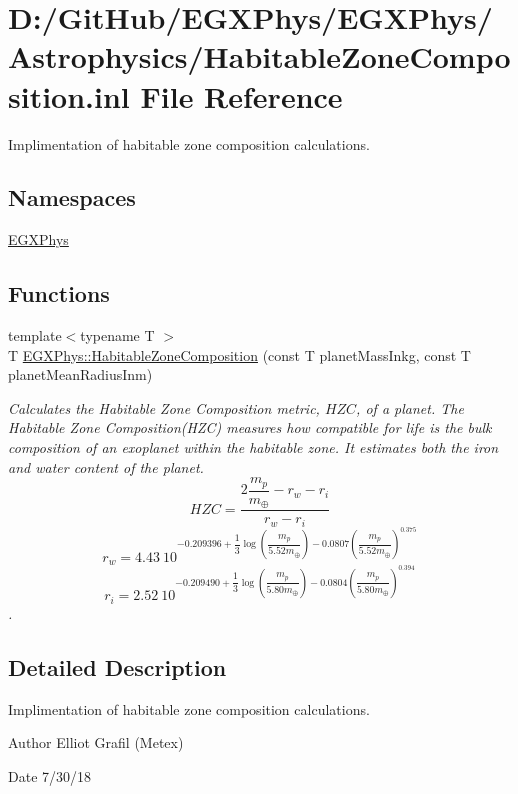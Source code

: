 \hypertarget{_habitable_zone_composition_8inl}{}\section{D\+:/\+Git\+Hub/\+E\+G\+X\+Phys/\+E\+G\+X\+Phys/\+Astrophysics/\+Habitable\+Zone\+Composition.inl File Reference}
\label{_habitable_zone_composition_8inl}


Implimentation of habitable zone composition calculations.  


\subsection*{Namespaces}
\begin{DoxyCompactItemize}
\item 
 \mbox{\hyperlink{namespace_e_g_x_phys}{E\+G\+X\+Phys}}
\end{DoxyCompactItemize}
\subsection*{Functions}
\begin{DoxyCompactItemize}
\item 
{\footnotesize template$<$typename T $>$ }\\T \mbox{\hyperlink{group___e_g_x_phys-_astrophysics-_habitable_zone_composition_ga9fe32e7d12b68d2596a0a8409681acdc}{E\+G\+X\+Phys\+::\+Habitable\+Zone\+Composition}} (const T planet\+Mass\+Inkg, const T planet\+Mean\+Radius\+Inm)
\begin{DoxyCompactList}\small\item\em Calculates the Habitable Zone Composition metric, $HZC$, of a planet. The Habitable Zone Composition(\+H\+Z\+C) measures how compatible for life is the bulk composition of an exoplanet within the habitable zone. It estimates both the iron and water content of the planet. \[ HZC= \dfrac{ 2\dfrac{m_p}{m_{\oplus}} - r_w - r_i } { r_w - r_i } \] \[ r_w= 4.43\ 10^{ -0.209396 + \dfrac{1}{3}\log \left ( \dfrac{m_p}{5.52 m_\oplus} \right ) - 0.0807 \left ( \dfrac{m_p}{5.52 m_\oplus} \right )^{0.375}} \] \[ r_i= 2.52\ 10^{ -0.209490 + \dfrac{1}{3}\log \left ( \dfrac{m_p}{5.80 m_\oplus} \right ) - 0.0804 \left ( \dfrac{m_p}{5.80 m_\oplus} \right )^{0.394}} \]. \end{DoxyCompactList}\end{DoxyCompactItemize}


\subsection{Detailed Description}
Implimentation of habitable zone composition calculations. 

\begin{DoxyAuthor}{Author}
Elliot Grafil (Metex) 
\end{DoxyAuthor}
\begin{DoxyDate}{Date}
7/30/18 
\end{DoxyDate}
